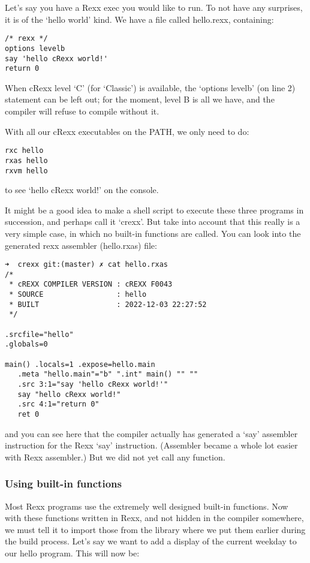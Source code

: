 Let's say you have a Rexx exec you would like to run. To not have any
surprises, it is of the `hello world' kind. We have a file called
hello.rexx, containing:

\begin{verbatim}
/* rexx */
options levelb
say 'hello cRexx world!'
return 0
\end{verbatim}

When cRexx level `C' (for `Classic') is available, the `options levelb'
(on line 2) statement can be left out; for the moment, level B is all we
have, and the compiler will refuse to compile without it.

With all our cRexx executables on the PATH, we only need to do:

\begin{verbatim}
rxc hello
rxas hello
rxvm hello
\end{verbatim}

to see `hello cRexx world!' on the console.

It might be a good idea to make a shell script to execute these three
programs in succession, and perhaps call it `crexx'. But take into
account that this really is a very simple case, in which no built-in
functions are called. You can look into the generated rexx assembler
(hello.rxas) file:

\begin{verbatim}
➜  crexx git:(master) ✗ cat hello.rxas
/*
 * cREXX COMPILER VERSION : cREXX F0043
 * SOURCE                 : hello
 * BUILT                  : 2022-12-03 22:27:52
 */

.srcfile="hello"
.globals=0

main() .locals=1 .expose=hello.main
   .meta "hello.main"="b" ".int" main() "" ""
   .src 3:1="say 'hello cRexx world!'"
   say "hello cRexx world!"
   .src 4:1="return 0"
   ret 0
\end{verbatim}

and you can see here that the compiler actually has generated a `say'
assembler instruction for the Rexx `say' instruction. (Assembler became
a whole lot easier with Rexx assembler.) But we did not yet call any
function.

\hypertarget{using-built-in-functions}{%
\subsubsection{Using built-in
functions}\label{using-built-in-functions}}

Most Rexx programs use the extremely well designed built-in functions.
Now with these functions written in Rexx, and not hidden in the compiler
somewhere, we must tell it to import those from the library where we put
them earlier during the build process. Let's say we want to add a
display of the current weekday to our hello program. This will now be:

